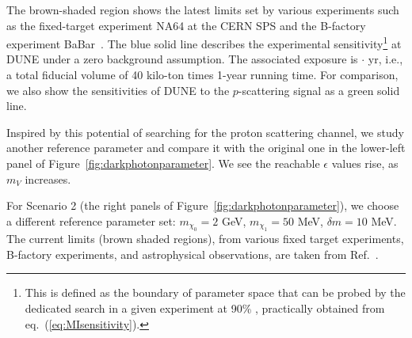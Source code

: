 The brown-shaded region shows the latest limits set by various experiments such as the fixed-target experiment NA64 at the CERN SPS and the B-factory experiment BaBar~\cite{Banerjee:2017hhz}.
The blue solid line describes the experimental sensitivity\footnote{This is defined as the boundary of parameter space that can be probed by the dedicated search in a given experiment at 90\% , practically obtained from eq.~(\ref{eq:MIsensitivity}).} at DUNE  under a zero background assumption.
The associated exposure is \fdfiducialmass $\cdot$ yr, i.e., a total fiducial volume of 40 kilo-ton times 1-year running time.
For comparison, we also show the sensitivities of DUNE to the $p$-scattering signal as a green solid line. 

Inspired by this potential of searching for the proton scattering channel, we study another reference parameter and compare it with the original one in the lower-left panel of Figure~\ref{fig:darkphotonparameter}. 
We see the reachable $\epsilon$ values rise, as $m_V$ increases. 


For Scenario 2 (the right panels of Figure~\ref{fig:darkphotonparameter}), we choose a different reference parameter set: $m_{\chi_0} = 2$ GeV, $m_{\chi_1} = 50$ MeV, $\delta m = 10$ MeV. 
The current limits (brown shaded regions), from various fixed target experiments, B-factory experiments, and astrophysical observations, are taken from Ref.~\cite{Banerjee:2018vgk}.


